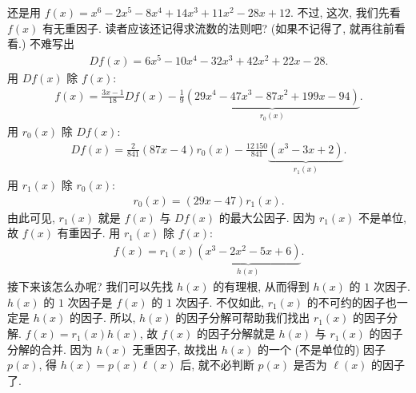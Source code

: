 \begin{example}
    还是用 $f(x) = x^6-2 x^5-8 x^4+14 x^3+11 x^2-28 x+12$. 不过, 这次, 我们先看 $f(x)$ 有无重因子. 读者应该还记得求流数的法则吧? (如果不记得了, 就再往前看看.) 不难写出
    \begin{align*}
        Df(x) = 6 x^5-10 x^4-32 x^3+42 x^2+22 x-28.
    \end{align*}
    用 $Df(x)$ 除 $f(x)$:
    \begin{align*}
        f(x) = \frac{3x-1}{18} Df(x) - \frac{1}{9} \underbrace{(29 x^4-47 x^3-87 x^2+199 x-94)}_{r_0 (x)}.
    \end{align*}
    用 $r_0 (x)$ 除 $Df(x)$:
    \begin{align*}
        Df(x) = \frac{2}{841} (87x-4) r_0 (x) - \frac{12\,150}{841} \underbrace{(x^3-3 x+2)}_{r_1 (x)}.
    \end{align*}
    用 $r_1 (x)$ 除 $r_0 (x)$:
    \begin{align*}
        r_0 (x) = (29x-47) r_1 (x).
    \end{align*}
    由此可见, $r_1 (x)$ 就是 $f(x)$ 与 $Df(x)$ 的最大公因子. 因为 $r_1 (x)$ 不是单位, 故 $f(x)$ 有重因子. 用 $r_1 (x)$ 除 $f(x)$:
    \begin{align*}
        f(x) = r_1 (x) \underbrace{(x^3-2 x^2-5 x+6)}_{h(x)}.
    \end{align*}
    接下来该怎么办呢? 我们可以先找 $h(x)$ 的有理根, 从而得到 $h(x)$ 的 $1$ 次因子. $h(x)$ 的 $1$ 次因子是 $f(x)$ 的 $1$ 次因子. 不仅如此, $r_1 (x)$ 的不可约的因子也一定是 $h(x)$ 的因子. 所以, $h(x)$ 的因子分解可帮助我们找出 $r_1 (x)$ 的因子分解. $f(x) = r_1 (x) h(x)$, 故 $f(x)$ 的因子分解就是 $h(x)$ 与 $r_1 (x)$ 的因子分解的合并. 因为 $h(x)$ 无重因子, 故找出 $h(x)$ 的一个 (不是单位的) 因子 $p(x)$, 得 $h(x) = p(x) \ell(x)$ 后, 就不必判断 $p(x)$ 是否为 $\ell (x)$ 的因子了.


\end{example}
